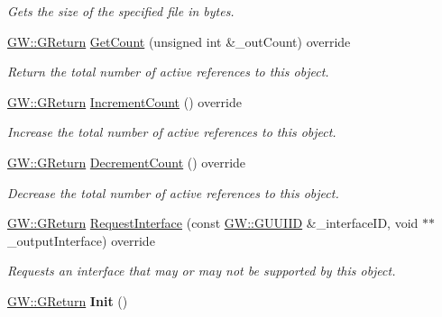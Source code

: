 \begin{DoxyCompactItemize}
\begin{DoxyCompactList}\small\item\em Gets the size of the specified file in bytes. \end{DoxyCompactList}\item 
\hyperlink{namespaceGW_a67a839e3df7ea8a5c5686613a7a3de21}{G\+W\+::\+G\+Return} \hyperlink{classFileIO_a20566e320ec4cc0d5615bc3bc1fa3013}{Get\+Count} (unsigned int \&\+\_\+out\+Count) override
\begin{DoxyCompactList}\small\item\em Return the total number of active references to this object. \end{DoxyCompactList}\item 
\hyperlink{namespaceGW_a67a839e3df7ea8a5c5686613a7a3de21}{G\+W\+::\+G\+Return} \hyperlink{classFileIO_a9f2c9a4d13577e14a2c94b0e9617d80b}{Increment\+Count} () override
\begin{DoxyCompactList}\small\item\em Increase the total number of active references to this object. \end{DoxyCompactList}\item 
\hyperlink{namespaceGW_a67a839e3df7ea8a5c5686613a7a3de21}{G\+W\+::\+G\+Return} \hyperlink{classFileIO_ab7e4806ca819c3fcdeeb40a2af5f0298}{Decrement\+Count} () override
\begin{DoxyCompactList}\small\item\em Decrease the total number of active references to this object. \end{DoxyCompactList}\item 
\hyperlink{namespaceGW_a67a839e3df7ea8a5c5686613a7a3de21}{G\+W\+::\+G\+Return} \hyperlink{classFileIO_a3fb39527fac479474c6ef5045dbc1551}{Request\+Interface} (const \hyperlink{structGW_1_1GUUIID}{G\+W\+::\+G\+U\+U\+I\+ID} \&\+\_\+interface\+ID, void $\ast$$\ast$\+\_\+output\+Interface) override
\begin{DoxyCompactList}\small\item\em Requests an interface that may or may not be supported by this object. \end{DoxyCompactList}\item 
\hyperlink{namespaceGW_a67a839e3df7ea8a5c5686613a7a3de21}{G\+W\+::\+G\+Return} {\bfseries Init} ()\hypertarget{classFileIO_a1c24bf6f35d30462fd918e5ee1a44033}{}\label{classFileIO_a1c24bf6f35d30462fd918e5ee1a44033}

\end{DoxyCompactItemize}


